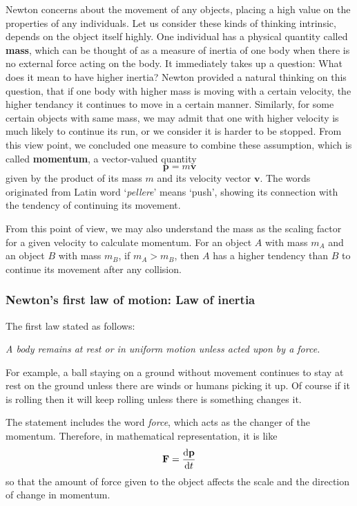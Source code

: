 \documentclass[12pt]{article}
\begin{document}
    Newton concerns about the movement of any objects, placing a high value on the properties of any individuals. Let us consider these kinds of thinking intrinsic, depends on the object itself highly. One individual has a physical quantity called \textbf{mass}, which can be thought of as a measure of inertia of one body when there is no external force acting on the body. It immediately takes up a question: What does it mean to have higher inertia? Newton provided a natural thinking on this question, that if one body with higher mass is moving with a certain velocity, the higher tendancy it continues to move in a certain manner. Similarly, for some certain objects with same mass, we may admit that one with higher velocity is much likely to continue its run, or we consider it is harder to be stopped. From this view point, we concluded one measure to combine these assumption, which is called \textbf{momentum}, a vector-valued quantity \[\mathbf{p}=m\mathbf{v}\] given by the product of its mass $m$ and its velocity vector $\mathbf{v}$. The words originated from Latin word `\textit{pellere}' means `push', showing its connection with the tendency of continuing its movement.

    From this point of view, we may also understand the mass as the scaling factor for a given velocity to calculate momentum. For an object $A$ with mass $m_A$ and an object $B$ with mass $m_B$, if $m_A>m_B$, then $A$ has a higher tendency than $B$ to continue its movement after any collision.

    \subsubsection*{Newton's first law of motion: Law of inertia}

    The first law stated as follows:

    \begin{center}
        \textit{A body remains at rest or in uniform motion unless acted upon by a force.}
    \end{center}

    For example, a ball staying on a ground without movement continues to stay at rest on the ground unless there are winds or humans picking it up. Of course if it is rolling then it will keep rolling unless there is something changes it.

    The statement includes the word \textit{force}, which acts as the changer of the momentum. Therefore, in mathematical representation, it is like \[\mathbf{F}=\derivative{\mathbf{p}}{t}\] so that the amount of force given to the object affects the scale and the direction of change in momentum.
\end{document}
